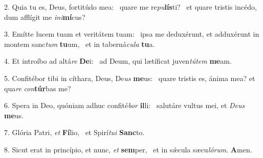 2. Quia tu es, Deus, fortitúdo mea: \dag\  quare me re\textit{pu}\textbf{lís}ti? \ast\  et quare tristis incédo, dum afflígit me \textit{in}\textit{i}\textbf{mí}cus?\

3. Emítte lucem tuam et veritátem tuam: \dag\  ipsa me deduxérunt, et adduxérunt in montem sanc\textit{tum} \textbf{tu}um, \ast\  et in taberná\textit{cu}\textit{la} \textbf{tu}a.\

4. Et introíbo ad altá\textit{re} \textbf{De}i: \ast\  ad Deum, qui lætíficat juven\textit{tú}\textit{tem} \textbf{me}am.\

5. Confitébor tibi in cíthara, Deus, De\textit{us} \textbf{me}us: \ast\  quare tristis es, ánima mea? et qua\textit{re} \textit{con}\textbf{túr}bas me?\

6. Spera in Deo, quóniam adhuc confité\textit{bor} \textbf{il}li: \ast\  salutáre vultus mei, et \textit{De}\textit{us} \textbf{me}us.\

7. Glória Patri, \textit{et} \textbf{Fí}lio, \ast\  et Spirí\textit{tu}\textit{i} \textbf{Sanc}to.\

8. Sicut erat in princípio, et nunc, \textit{et} \textbf{sem}per, \ast\  et in sǽcula sæcu\textit{ló}\textit{rum}. \textbf{A}men.\

